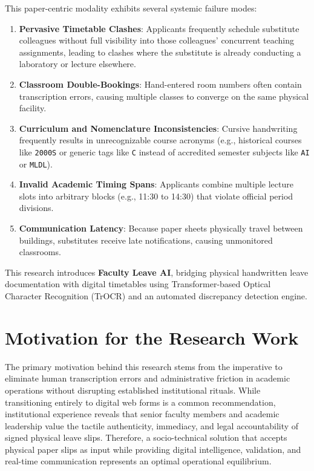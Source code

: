 \documentclass[12pt,letterpaper]{report}
\begin{document}
This paper-centric modality exhibits several systemic failure modes:
\begin{enumerate}
    \item \textbf{Pervasive Timetable Clashes}: Applicants frequently schedule substitute colleagues without full visibility into those colleagues' concurrent teaching assignments, leading to clashes where the substitute is already conducting a laboratory or lecture elsewhere.
    \item \textbf{Classroom Double-Bookings}: Hand-entered room numbers often contain transcription errors, causing multiple classes to converge on the same physical facility.
    \item \textbf{Curriculum and Nomenclature Inconsistencies}: Cursive handwriting frequently results in unrecognizable course acronyms (e.g., historical courses like \texttt{2000S} or generic tags like \texttt{C} instead of accredited semester subjects like \texttt{AI} or \texttt{MLDL}).
    \item \textbf{Invalid Academic Timing Spans}: Applicants combine multiple lecture slots into arbitrary blocks (e.g., 11:30 to 14:30) that violate official period divisions.
    \item \textbf{Communication Latency}: Because paper sheets physically travel between buildings, substitutes receive late notifications, causing unmonitored classrooms.
\end{enumerate}

This research introduces \textbf{Faculty Leave AI}, bridging physical handwritten leave documentation with digital timetables using Transformer-based Optical Character Recognition (TrOCR) and an automated discrepancy detection engine.

\section{Motivation for the Research Work}
The primary motivation behind this research stems from the imperative to eliminate human transcription errors and administrative friction in academic operations without disrupting established institutional rituals. While transitioning entirely to digital web forms is a common recommendation, institutional experience reveals that senior faculty members and academic leadership value the tactile authenticity, immediacy, and legal accountability of signed physical leave slips. Therefore, a socio-technical solution that accepts physical paper slips as input while providing digital intelligence, validation, and real-time communication represents an optimal operational equilibrium.
\end{document}
